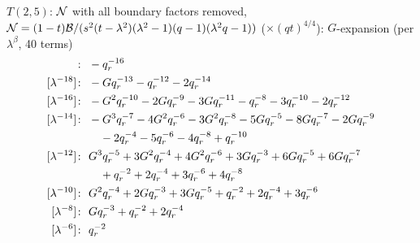 $T(2,5)$: $\mathcal{N}$ with all boundary factors removed, $\mathcal{N} = (1-t)\mathcal{B}/(s^2(t-\lambda^2)(\lambda^2-1)(q-1)(\lambda^2q-1))$ ($\times (qt)^{4/4}$): $G$-expansion (per $\lambda^\beta$, 40 terms)
\begin{align*}
[\lambda^{-20}]\colon\ & -\qr^{-16} \\
[\lambda^{-18}]\colon\ & -G \qr^{-13} -\qr^{-12} -2 \qr^{-14} \\
[\lambda^{-16}]\colon\ & -G^{2} \qr^{-10} -2 G \qr^{-9} -3 G \qr^{-11} -\qr^{-8} -3 \qr^{-10} -2 \qr^{-12} \\
[\lambda^{-14}]\colon\ & -G^{3} \qr^{-7} -4 G^{2} \qr^{-6} -3 G^{2} \qr^{-8} -5 G \qr^{-5} -8 G \qr^{-7} -2 G \qr^{-9} \\
& \quad -2 \qr^{-4} -5 \qr^{-6} -4 \qr^{-8} +\qr^{-10} \\
[\lambda^{-12}]\colon\ & G^{3} \qr^{-5} +3 G^{2} \qr^{-4} +4 G^{2} \qr^{-6} +3 G \qr^{-3} +6 G \qr^{-5} +6 G \qr^{-7} \\
& \quad +\qr^{-2} +2 \qr^{-4} +3 \qr^{-6} +4 \qr^{-8} \\
[\lambda^{-10}]\colon\ & G^{2} \qr^{-4} +2 G \qr^{-3} +3 G \qr^{-5} +\qr^{-2} +2 \qr^{-4} +3 \qr^{-6} \\
[\lambda^{-8}]\colon\ & G \qr^{-3} +\qr^{-2} +2 \qr^{-4} \\
[\lambda^{-6}]\colon\ & \qr^{-2}
\end{align*}

